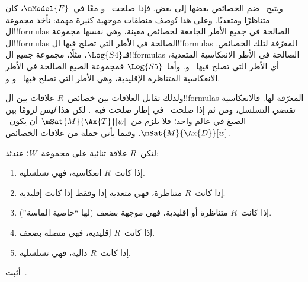 \documentclass[../../../include/open-logic-section]{subfiles}
\begin{document}
ويتيح~ ضم الخصائص بعضها إلى بعض.
فإذا صلحت~ و معًا في~$\mModel{F}$، كان متناظرًا
ومتعديًا. وعلى هذا تُوصف منطقات موجهية كثيرة مهمة:
نأخذ مجموعة ال!!{formula}s الصالحة في جميع الأطر الجامعة
لخصائص معينة، وهي نفسها مجموعة ال!!{formula}s الصالحة في
الأطر التي تصلح فيها ال!!{formula}s المعرّفة لتلك الخصائص.
فـ$\Log{S4}$، مثلًا، مجموعة جميع ال!!{formula}s الصالحة في
الأطر الانعكاسية المتعدية، أي الأطر التي تصلح فيها~ و.
وأما~$\Log{S5}$ فمجموعة الصيغ الصالحة في الأطر الانعكاسية
المتناظرة الإقليدية، وهي الأطر التي تصلح فيها~ و و.

ولذلك تقابل العلاقات بين خصائص~$R$ علاقات بين ال!!{formula}s
المعرّفة لها. فالانعكاسية تقتضي التسلسل، ومن ثم إذا صلحت~
في إطار صلحت فيه~. لكن هذا \emph{ليس} لزومًا بين الصيغ
في عالم واحد؛ فلا يلزم من~$\mSat{M}{\Ax{T}}[w]$
أن يكون~$\mSat{M}{\Ax{D}}[w]$. وفيما يأتي جملة من علاقات الخصائص.

\begin{prop}
  لتكن~$R$ علاقة ثنائية على مجموعة~$W$؛ عندئذ:
  \begin{enumerate}
  \item إذا كانت~$R$ انعكاسية، فهي تسلسلية.
  \item إذا كانت~$R$ متناظرة، فهي متعدية إذا وفقط إذا كانت إقليدية.
  \item إذا كانت~$R$ متناظرة أو إقليدية، فهي موجهة بضعف (لها ``خاصية
    الماسة'').
  \item إذا كانت~$R$ إقليدية، فهي متصلة بضعف.
  \item إذا كانت~$R$ دالية، فهي تسلسلية.
  \end{enumerate}
\end{prop}

\begin{prob}
  أثبت~.
\end{prob}
\end{document}
